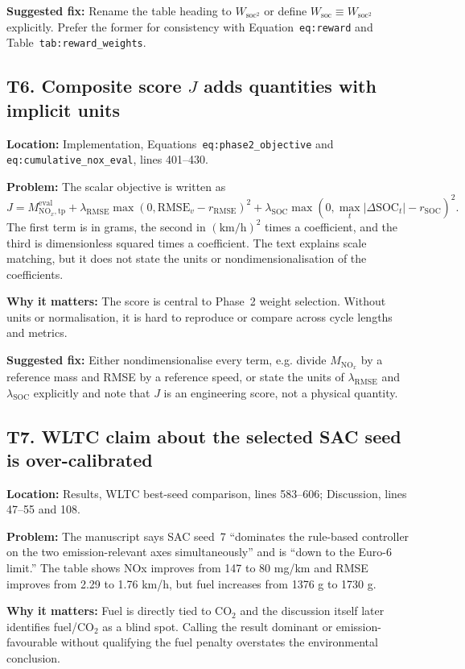 \documentclass[11pt,a4paper]{article}
\newcommand{\loc}[1]{\textbf{Location:} #1\par}
\newcommand{\problem}{\textbf{Problem:} }
\newcommand{\why}{\textbf{Why it matters:} }
\newcommand{\fix}{\textbf{Suggested fix:} }
\begin{document}
\fix Rename the table heading to $W_{\text{soc}^2}$ or define $W_{\text{soc}} \equiv W_{\text{soc}^2}$ explicitly. Prefer the former for consistency with Equation~\texttt{eq:reward} and Table~\texttt{tab:reward\_weights}.

\subsection*{T6. Composite score $J$ adds quantities with implicit units}

\loc{Implementation, Equations~\texttt{eq:phase2\_objective} and \texttt{eq:cumulative\_nox\_eval}, lines 401--430.}
\problem The scalar objective is written as
\[
J=M_{\mathrm{NO}_{x},\mathrm{tp}}^{\mathrm{eval}}+\lambda_{\text{RMSE}}\max(0,\mathrm{RMSE}_v-r_{\text{RMSE}})^2+\lambda_{\text{SOC}}\max(0,\max_t|\Delta\mathrm{SOC}_t|-r_{\text{SOC}})^2.
\]
The first term is in grams, the second in $(\mathrm{km/h})^2$ times a coefficient, and the third is dimensionless squared times a coefficient. The text explains scale matching, but it does not state the units or nondimensionalisation of the coefficients.

\why The score is central to Phase~2 weight selection. Without units or normalisation, it is hard to reproduce or compare across cycle lengths and metrics.

\fix Either nondimensionalise every term, e.g. divide $M_{\mathrm{NO}_{x}}$ by a reference mass and RMSE by a reference speed, or state the units of $\lambda_{\text{RMSE}}$ and $\lambda_{\text{SOC}}$ explicitly and note that $J$ is an engineering score, not a physical quantity.

\subsection*{T7. WLTC claim about the selected SAC seed is over-calibrated}

\loc{Results, WLTC best-seed comparison, lines 583--606; Discussion, lines 47--55 and 108.}
\problem The manuscript says SAC seed~7 ``dominates the rule-based controller on the two emission-relevant axes simultaneously'' and is ``down to the Euro-6 limit.'' The table shows NOx improves from 147 to 80 mg/km and RMSE improves from 2.29 to 1.76 km/h, but fuel increases from 1376 g to 1730 g.

\why Fuel is directly tied to CO$_2$ and the discussion itself later identifies fuel/CO$_2$ as a blind spot. Calling the result dominant or emission-favourable without qualifying the fuel penalty overstates the environmental conclusion.
\end{document}
